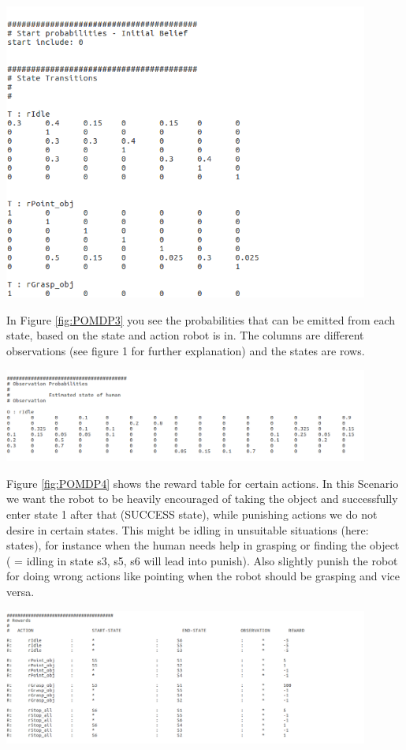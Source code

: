 \begin{minipage}{0.8\textwidth}
\centering
	\includegraphics[width=12cm]{Pictures/func/POMDP/POMDP2.png}
	\label{fig:POMDP2}
\end{minipage}

In Figure \ref{fig:POMDP3} you see the probabilities that can be emitted from each state, based on the state and action robot is in. The columns are different observations (see figure 1 for further explanation) and the states are rows.

\begin{minipage}{0.8\textwidth}
\centering
	\includegraphics[width=12cm]{Pictures/func/POMDP/POMDP3.png}
	\label{fig:POMDP3}
\end{minipage}

Figure \ref{fig:POMDP4} shows the reward table for certain actions. In this Scenario we want the robot to be heavily encouraged of taking the object and successfully enter state 1 after that (SUCCESS state), while punishing actions we do not desire in certain states. This might be idling in unsuitable situations (here: states), for instance when the human needs help in grasping or finding the object ( = idling in state s3, s5, s6 will lead into punish). Also slightly punish the robot for doing wrong actions like pointing when the robot should be grasping and vice versa.

\begin{minipage}{0.8\textwidth}
\centering
	\includegraphics[width=12cm]{Pictures/func/POMDP/POMDP4.png}
	\label{fig:POMDP4}
\end{minipage}
